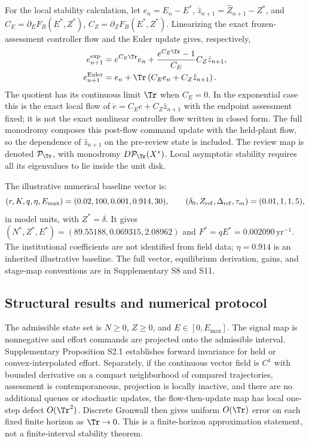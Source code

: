 For the local stability calculation, let \(e_n=E_n-E^*\), \(\hat z_{n+1}=\widehat Z_{n+1}-Z^*\), and \(C_E=\partial_EF_B(E^*,Z^*)\), \(C_Z=\partial_ZF_B(E^*,Z^*)\). Linearizing the exact frozen-assessment controller flow and the Euler update gives, respectively,
\begin{align}
e_{n+1}^{\rm exp}&=e^{C_E\Tr}e_n+\frac{e^{C_E\Tr}-1}{C_E}C_Z\hat z_{n+1},\\
e_{n+1}^{\rm Euler}&=e_n+\Tr\left(C_Ee_n+C_Z\hat z_{n+1}\right).
\end{align}
The quotient has its continuous limit \(\Tr\) when \(C_E=0\). In the exponential case this is the exact local flow of \(\dot e=C_Ee+C_Z\hat z_{n+1}\) with the endpoint assessment fixed; it is not the exact nonlinear controller flow written in closed form. The full monodromy composes this post-flow command update with the held-plant flow, so the dependence of \(\hat z_{n+1}\) on the pre-review state is included. The review map is denoted \(\mathcal P_{\Tr}\), with monodromy \(D\mathcal P_{\Tr}(X^*)\). Local asymptotic stability requires all its eigenvalues to lie inside the unit disk.

The illustrative numerical baseline vector is:
\[
(r,K,q,\eta,E_{\max})=(0.02,100,0.001,0.914,30),\qquad
(\delta_0,Z_{\rm ref},\Delta_{\rm ref},\tau_m)=(0.01,1,1,5),
\]
in model units, with \(Z^*=\delta\). It gives \((N^*,Z^*,E^*)=(89.55188,0.069315,2.08962)\) and \(F^*=qE^*=0.002090\,\mathrm{yr}^{-1}\). The institutional coefficients are not identified from field data; \(\eta=0.914\) is an inherited illustrative baseline. The full vector, equilibrium derivation, gains, and stage-map conventions are in Supplementary S8 and S11.

\subsection{Structural results and numerical protocol}\label{sec:structural-methods}

The admissible state set is \(N\geq0\), \(Z\geq0\), and \(E\in[0,E_{\max}]\). The signal map is nonnegative and effort commands are projected onto the admissible interval. Supplementary Proposition S2.1 establishes forward invariance for held or convex-interpolated effort. Separately, if the continuous vector field is \(C^1\) with bounded derivative on a compact neighborhood of compared trajectories, assessment is contemporaneous, projection is locally inactive, and there are no additional queues or stochastic updates, the flow-then-update map has local one-step defect \(O(\Tr^2)\). Discrete Gronwall then gives uniform \(O(\Tr)\) error on each fixed finite horizon as \(\Tr\to0\). This is a finite-horizon approximation statement, not a finite-interval stability theorem.

